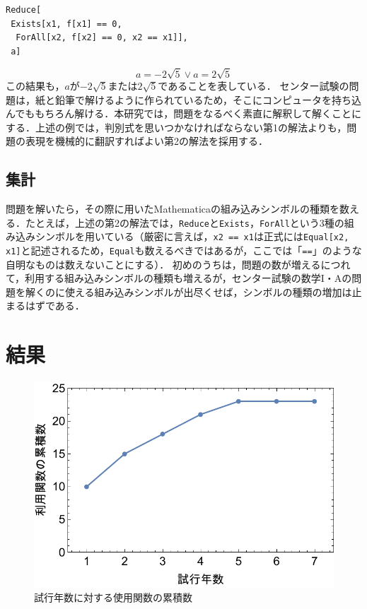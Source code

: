 \documentclass[uplatex,twocolumn]{jsarticle}
\begin{document}
\begin{verbatim}
Reduce[
 Exists[x1, f[x1] == 0,
  ForAll[x2, f[x2] == 0, x2 == x1]],
 a]
\end{verbatim}
\vspace{-5mm}\[a=-2 \sqrt{5}\lor a=2 \sqrt{5}\]
この結果も，$a$が$-2\sqrt{5}$または$2\sqrt{5}$であることを表している．
センター試験の問題は，紙と鉛筆で解けるように作られているため，そこにコンピュータを持ち込んでももちろん解ける．本研究では，問題をなるべく素直に解釈して解くことにする．上述の例では，判別式を思いつかなければならない第1の解法よりも，問題の表現を機械的に翻訳すればよい第2の解法を採用する．


\subsection{集計}
問題を解いたら，その際に用いたMathematicaの組み込みシンボルの種類を数える．たとえば，上述の第2の解法では，\verb|Reduce|と\verb|Exists|，\verb|ForAll|という3種の組み込みシンボルを用いている（厳密に言えば，\verb|x2 == x1|は正式には\verb|Equal[x2, x1]|と記述されるため，\verb|Equal|も数えるべきではあるが，ここでは「\verb|==|」のような自明なものは数えないことにする）．
初めのうちは，問題の数が増えるにつれて，利用する組み込みシンボルの種類も増えるが，センター試験の数学I・Aの問題を解くのに使える組み込みシンボルが出尽くせば，シンボルの種類の増加は止まるはずである．



\section{結果}
\begin{figure}[tb]
\centering
\includegraphics[scale=0.5]{code.pdf}
\caption{試行年数に対する使用関数の累積数}\label{累積グラフ}
\end{figure}
\end{document}
